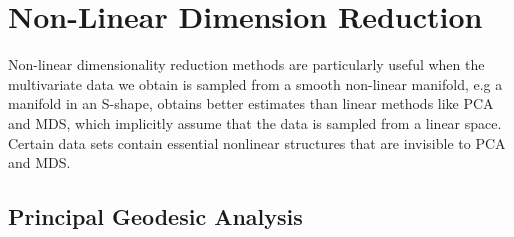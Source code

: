 \documentclass[12pt]{report}
\begin{document}
\section{Non-Linear Dimension Reduction}

Non-linear dimensionality reduction methods are particularly useful when the multivariate data we obtain is sampled from a smooth non-linear manifold, e.g a manifold in an S-shape, obtains better estimates than linear methods like PCA and MDS, which implicitly assume that the data is sampled from a linear space. Certain data sets contain essential nonlinear structures that are invisible to PCA and MDS.

\newpage

\subsection{Principal Geodesic Analysis}
\end{document}
